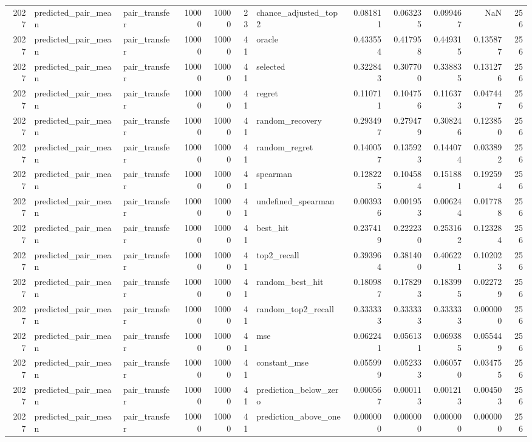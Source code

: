 \begin{tabular}{rllrrrlrrrrr}
2027 & predicted_pair_mean & pair_transfer & 10000 & 10000 & 23 & chance_adjusted_top2 & 0.081811 & 0.063235 & 0.099467 & NaN & 256 \\
2027 & predicted_pair_mean & pair_transfer & 10000 & 10000 & 41 & oracle & 0.433554 & 0.417958 & 0.449315 & 0.135877 & 256 \\
2027 & predicted_pair_mean & pair_transfer & 10000 & 10000 & 41 & selected & 0.322843 & 0.307700 & 0.338835 & 0.131276 & 256 \\
2027 & predicted_pair_mean & pair_transfer & 10000 & 10000 & 41 & regret & 0.110711 & 0.104756 & 0.116373 & 0.047447 & 256 \\
2027 & predicted_pair_mean & pair_transfer & 10000 & 10000 & 41 & random_recovery & 0.293497 & 0.279479 & 0.308246 & 0.123850 & 256 \\
2027 & predicted_pair_mean & pair_transfer & 10000 & 10000 & 41 & random_regret & 0.140057 & 0.135923 & 0.144074 & 0.033892 & 256 \\
2027 & predicted_pair_mean & pair_transfer & 10000 & 10000 & 41 & spearman & 0.128225 & 0.104584 & 0.151881 & 0.192594 & 256 \\
2027 & predicted_pair_mean & pair_transfer & 10000 & 10000 & 41 & undefined_spearman & 0.003936 & 0.001953 & 0.006244 & 0.017788 & 256 \\
2027 & predicted_pair_mean & pair_transfer & 10000 & 10000 & 41 & best_hit & 0.237419 & 0.222230 & 0.253162 & 0.123284 & 256 \\
2027 & predicted_pair_mean & pair_transfer & 10000 & 10000 & 41 & top2_recall & 0.393964 & 0.381400 & 0.406221 & 0.102023 & 256 \\
2027 & predicted_pair_mean & pair_transfer & 10000 & 10000 & 41 & random_best_hit & 0.180987 & 0.178293 & 0.183995 & 0.022729 & 256 \\
2027 & predicted_pair_mean & pair_transfer & 10000 & 10000 & 41 & random_top2_recall & 0.333333 & 0.333333 & 0.333333 & 0.000000 & 256 \\
2027 & predicted_pair_mean & pair_transfer & 10000 & 10000 & 41 & mse & 0.062241 & 0.056131 & 0.069385 & 0.055449 & 256 \\
2027 & predicted_pair_mean & pair_transfer & 10000 & 10000 & 41 & constant_mse & 0.055999 & 0.052333 & 0.060570 & 0.034755 & 256 \\
2027 & predicted_pair_mean & pair_transfer & 10000 & 10000 & 41 & prediction_below_zero & 0.000567 & 0.000113 & 0.001213 & 0.004503 & 256 \\
2027 & predicted_pair_mean & pair_transfer & 10000 & 10000 & 41 & prediction_above_one & 0.000000 & 0.000000 & 0.000000 & 0.000000 & 256 \\

\end{tabular}
